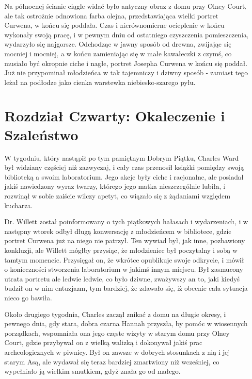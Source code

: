 Na północnej ścianie ciągle widać było antyczny obraz z domu przy Olney Court, ale tak ostrożnie odnowiona farba olejna, przedstawiająca wielki portret Curwena, w końcu się poddała. Czas i nierównomierne ocieplenie w końcu wykonały swoją pracę, i w pewnym dniu od ostatniego czyszczenia pomieszczenia, wydarzyło się najgorsze. Odchodząc w jawny sposób od drewna, zwijając się mocniej i mocniej, a w końcu zamieniając się w małe kawałeczki z czymś, co musiało być okropnie ciche i nagłe, portret Josepha Curwena w końcu się poddał. Już nie przypominał młodzieńca w tak tajemniczy i dziwny sposób - zamiast tego leżał na podłodze jako cienka warstewka niebiesko-szarego pyłu. 

\section{Rozdział Czwarty: Okaleczenie i Szaleństwo}

W tygodniu, który nastąpił po tym pamiętnym Dobrym Piątku, Charles Ward był widziany częściej niż zazwyczaj, i cały czas przenosił książki pomiędzy swoją biblioteką a swoim laboratorium. Jego akcje były ciche i racjonalne, ale posiadał jakiś nawiedzony wyraz twarzy, którego jego matka nieszczególnie lubiła, i rozwinął w sobie zaiście wilczy apetyt, co wiązało się z żądaniami względem kucharza.

Dr. Willett został poinformowany o tych piątkowych hałasach i wydarzeniach, i w następny wtorek odbył długą konwersację z młodzieńcem w bibliotece, gdzie portret Curwena już na niego nie patrzył. Ten wywiad był, jak inne, pozbawiony konkluzji, ale Willett mógłby przysiąc, że młodzieniec był poczytalny i sobą w tamtym momencie. Przysięgał on, że wkrótce opublikuje swoje odkrycie, i mówił o konieczności stworzenia laboratorium w jakimś innym miejscu. Był zasmucony utrata portretu ale ledwie ledwie, co było dziwne, zważywszy an to, jaki kiedyś budził on w nim entuzjazm, tym bardziej, że zdawało się, iż obecnie cała sytuacja nieco go bawiła. 

Około drugiego tygodnia, Charles zaczął znikać z domu na długie okresy, i pewnego dnia, gdy stara, dobra czarna Hannah przyszła, by pomóc w wiosennych porządkach, wspomniała ona jego częste wizyty w starym domu przy Olney Court, gdzie przybywał on z wielką walizką i dokonywał jakiś prac archeologicznych w piwnicy. Był on zawsze w dobrych stosunkach z nią i jej starym Asą, ale wydawał się teraz bardziej zmartwiony niż wcześniej, co wypełniało ją wielkim smutkiem, gdyż znała go od małego. 

